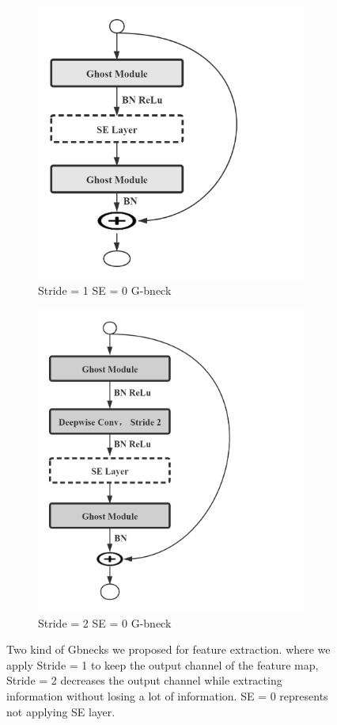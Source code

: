 \begin{figure}[h]
	\begin{center}
		\begin{subfigure}[b]{0.49\textwidth}
			\includegraphics[width=3.5in]{thesis-template-master/images/stride1 module.png}
			\caption{Stride = 1 SE = 0 G-bneck}
			\label{fig:res18}
		\end{subfigure}
		\begin{subfigure}[b]{0.49\textwidth}
			\includegraphics[width=3.5in]{thesis-template-master/images/stride2 module.png}
			\caption{Stride = 2 SE = 0 G-bneck}
			\label{fig:cellnet}
		\end{subfigure}
	\end{center}
	\caption{Two kind of Gbnecks we proposed for feature extraction. where we apply Stride = 1 to keep the output channel of the feature map, Stride = 2 decreases the output channel while extracting information without losing a lot of information. SE = 0 represents not applying SE layer.}
\end{figure}


